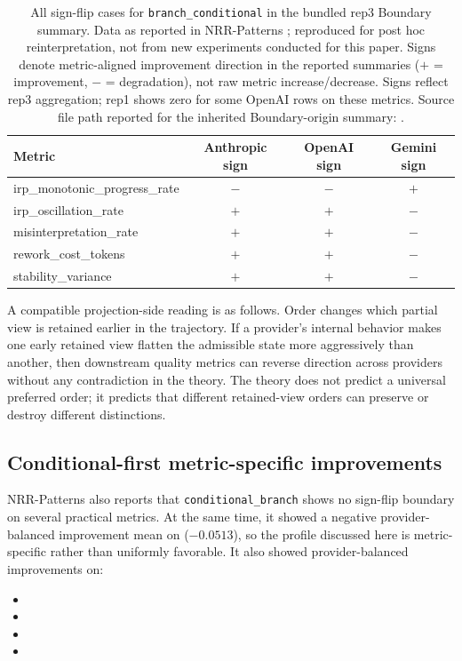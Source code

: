 \documentclass[11pt,a4paper]{article}
\begin{document}
\begin{table}[h]
\centering
\small
\begin{tabular}{p{5.2cm}ccc}
\toprule
Metric & Anthropic sign & OpenAI sign & Gemini sign \\
\midrule
irp\_monotonic\_progress\_rate & $-$ & $-$ & $+$ \\
irp\_oscillation\_rate & $+$ & $+$ & $-$ \\
misinterpretation\_rate & $+$ & $+$ & $-$ \\
rework\_cost\_tokens & $+$ & $+$ & $-$ \\
stability\_variance & $+$ & $+$ & $-$ \\
\bottomrule
\end{tabular}
\caption{All sign-flip cases for \texttt{branch\_conditional} in the bundled rep3 Boundary summary. Data as reported in NRR-Patterns \cite{saito2026patterns}; reproduced for post hoc reinterpretation, not from new experiments conducted for this paper. Signs denote metric-aligned improvement direction in the reported summaries ($+$ = improvement, $-$ = degradation), not raw metric increase/decrease. Signs reflect rep3 aggregation; rep1 shows zero for some OpenAI rows on these metrics. Source file path reported for the inherited Boundary-origin summary: \protect{}.}
\label{tab:boundary_signflip}
\end{table}

A compatible projection-side reading is as follows. Order changes which partial view is retained earlier in the trajectory. If a provider's internal behavior makes one early retained view flatten the admissible state more aggressively than another, then downstream quality metrics can reverse direction across providers without any contradiction in the theory. The theory does not predict a universal preferred order; it predicts that different retained-view orders can preserve or destroy different distinctions.

\subsection{Conditional-first metric-specific improvements}

NRR-Patterns \cite{saito2026patterns} also reports that \texttt{conditional\_branch} shows no sign-flip boundary on several practical metrics.
At the same time, it showed a negative provider-balanced improvement mean on  ($-0.0513$), so the profile discussed here is metric-specific rather than uniformly favorable.
It also showed provider-balanced improvements on:
\begin{itemize}
  \item {}
  \item {}
  \item {}
  \item {}
\end{itemize}
\end{document}
